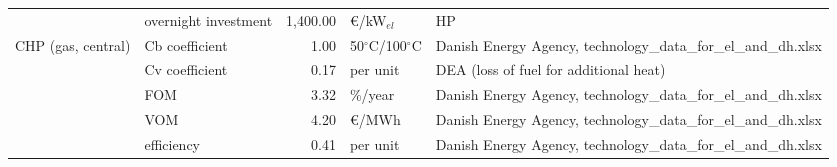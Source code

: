 \begin{longtable}{p{4cm}p{4cm}rp{3cm}p{10cm}}
                      & overnight investment &     1,400.00 &               \euro/kW$_{el}$ &                                                                                                                                                                                                                                                                                                                                   HP \\
CHP (gas, central) & Cb coefficient &         1.00 &  50$^{\circ}$C/100$^{\circ}$C &                                                                                                                                                                                                                                                                        Danish Energy Agency, technology\_data\_for\_el\_and\_dh.xlsx \\
                      & Cv coefficient &         0.17 &                      per unit &                                                                                                                                                                                                                                                                                               DEA (loss of fuel for additional heat) \\
                      & FOM &         3.32 &                       \%/year &                                                                                                                                                                                                                                                                        Danish Energy Agency, technology\_data\_for\_el\_and\_dh.xlsx \\
                      & VOM &         4.20 &                     \euro/MWh &                                                                                                                                                                                                                                                                        Danish Energy Agency, technology\_data\_for\_el\_and\_dh.xlsx \\
                      & efficiency &         0.41 &                      per unit &                                                                                                                                                                                                                                                                        Danish Energy Agency, technology\_data\_for\_el\_and\_dh.xlsx \\

\end{longtable}
